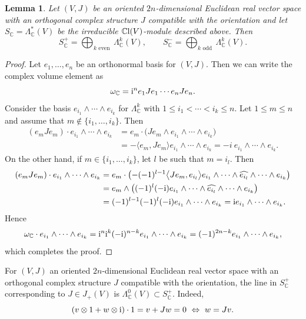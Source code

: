 \documentclass[pdftex]{sigma}%
\newcommand{\C}{\mathbb{C}}
\newcommand{\CCl}{\mathbb{C}{\rm l}}
\numberwithin{equation}{section}
\newtheorem{Lemma}[Theorem]{Lemma}
\begin{document}
\begin{Lemma}\label{plusmin}
Let $(V,J)$ be an oriented $2n$-dimensional Euclidean real vector space with an orthogonal complex structure $J$ compatible with the orientation and let $S_\C=\Lambda^*_\C(V)$ be the irreducible $\CCl(V)$-module described above. Then
\[
S_\C^+ = \bigoplus_{k \text{ even }} \Lambda_\C^k(V), \qquad S_\C^- = \bigoplus_{k \text{ odd }} \Lambda_\C^k(V).
\]
\end{Lemma}
\begin{proof}
Let $e_1, \ldots, e_n$ be an orthonormal basis for $(V,J)$. Then we can write the complex volume element as
\[
\omega_\C = {\rm i}^n e_1 Je_1 \cdots e_n Je_n .
\]
Consider the basis $e_{i_1} \wedge \cdots \wedge e_{i_k}$ for $\Lambda^k_{\C}$ with $1\leq i_1 < \cdots < i_k \leq n$. Let $1 \leq m \leq n$
and assume that $m \not \in \{i_1, \ldots, i_k \}$. Then
\[
\begin{aligned}
(e_m Je_m) \cdot e_{i_1} \wedge \cdots \wedge e_{i_k} & = e_m \cdot \big( Je_m \wedge e_{i_1} \wedge \cdots \wedge e_{i_k} \big) \\
& = -\big\langle e_m, Je_m \big\rangle e_{i_1} \wedge \cdots \wedge e_{i_k} = -i \ e_{i_1} \wedge \cdots \wedge e_{i_k}.
\end{aligned}
\]
On the other hand, if $m \in \{i_1, \ldots, i_k\}$, let $l$ be such that $m=i_l$. Then
\[
\begin{aligned}
(e_m Je_m) \cdot e_{i_1} \wedge \cdots \wedge e_{i_k} & = e_m \cdot \big( {-} (-1)^{l-1} \big\langle Je_m, e_{i_l} \big\rangle e_{i_1} \wedge \cdots \wedge \widehat{e_{i_l}} \wedge \cdots \wedge e_{i_k} \big)\\
& = e_m \wedge\big( (-1)^l (-{\rm i}) e_{i_1} \wedge \cdots \wedge \widehat{e_{i_l}} \wedge \cdots \wedge e_{i_k} \big) \\
& = (-1)^{l-1} (-1)^l(-{\rm i}) e_{i_1} \wedge \cdots \wedge e_{i_k} = {\rm i} e_{i_1} \wedge \cdots \wedge e_{i_k}.
\end{aligned}
\]
Hence
\[
\omega_\C \cdot e_{i_1} \wedge \cdots \wedge e_{i_k} = {\rm i}^n {\rm i}^k (-{\rm i})^{n-k} e_{i_1} \wedge \cdots \wedge e_{i_k} = (-1)^{2n-k} e_{i_1} \wedge \cdots \wedge e_{i_k},
\]
which completes the proof.
\end{proof}

\begin{Remark}
\label{lift}
For $(V,J)$ an oriented $2n$-dimensional Euclidean real vector space with an orthogonal complex structure $J$ compatible with the orientation, the line in $S^+_\C$ corresponding to $J\in J_+(V)$ is $\Lambda^0_\C(V)\subset S_\C^+$.
Indeed,
\[(v \otimes 1 + w \otimes {\rm i}) \cdot 1 = v+Jw = 0 \ \Leftrightarrow \ w=Jv. \]
\end{Remark}
\end{document}
